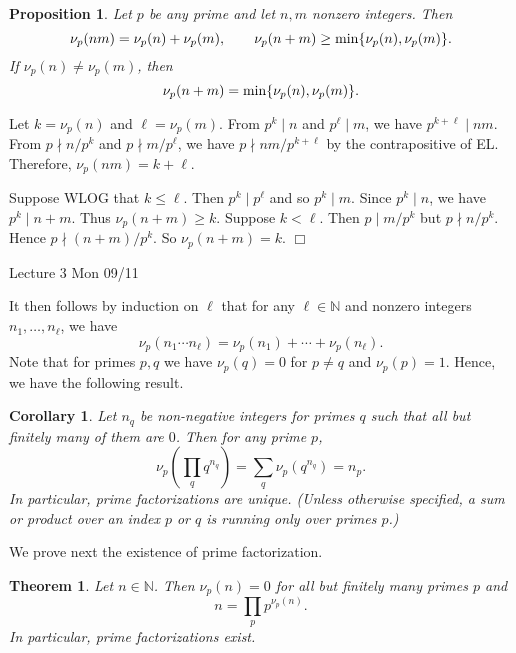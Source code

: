 \documentclass{article}
\def\min{{\rm min}}
\def\N{{\mathbb N}}
\newtheorem{theorem}[subsection]{Theorem}
\newtheorem{cor}[subsection]{Corollary}
\newtheorem{proposition}[subsection]{Proposition}
\newenvironment{proof}{\noindent {\bf Proof:}}{$\Box$ \vspace{2 ex}}
\newcommand{\add}[1]{{\color{blue} #1}}
\begin{document}
\begin{proposition}
    Let $p$ be any prime and let $n,m$ nonzero integers. Then
    $$\nu_p(nm) = \nu_p(n) + \nu_p(m),\qquad \nu_p(n+m) \geq \min\{\nu_p(n),\nu_p(m)\}.$$
    If $\nu_p(n)\neq \nu_p(m)$, then $$\nu_p(n+m) = \min\{\nu_p(n),\nu_p(m)\}.$$
\end{proposition}

\begin{proof}
    Let $k = \nu_p(n)$ and $\ell = \nu_p(m)$. From $p^k\mid n$ and $p^\ell\mid m$, we have $p^{k+\ell}\mid nm$. From $p\nmid n/p^k$ and $p\nmid m/p^\ell$, we have $p\nmid nm/p^{k+\ell}$ by the contrapositive of EL. Therefore, $\nu_p(nm) = k + \ell$.

    Suppose WLOG that $k\leq \ell$. Then $p^k\mid p^\ell$ and so $p^k\mid m$. Since $p^k\mid n$, we have $p^k\mid n+m$. Thus $\nu_p(n+m)\geq k$. Suppose $k<\ell$. Then $p\mid m/p^k$ but $p\nmid n/p^k$. Hence $p\nmid (n+m)/p^k$. So $\nu_p(n+m) = k$.
\end{proof}

\begin{center}
    \add{Lecture 3 Mon 09/11}
\end{center}

It then follows by induction on $\ell$ that for any $\ell\in\N$ and nonzero integers $n_1,\ldots,n_\ell$, we have
$$\nu_p(n_1\cdots n_\ell) = \nu_p(n_1) + \cdots + \nu_p(n_\ell).$$
Note that for primes $p,q$ we have $\nu_p(q) = 0$ for $p\neq q$ and $\nu_p(p) = 1$. Hence, we have the following result.

\begin{cor}
    Let $n_q$ be non-negative integers for primes $q$ such that all but finitely many of them are $0$. Then for any prime $p$,
    $$\nu_p\left(\prod_q q^{n_q}\right) = \sum_q \nu_p(q^{n_q}) =  n_p.$$
    In particular, prime factorizations are unique. (Unless otherwise specified, a sum or product over an index $p$ or $q$ is running only over primes $p$.)
\end{cor}

We prove next the existence of prime factorization.






\begin{theorem}
    Let $n\in\N$. Then $\nu_p(n) = 0$ for all but finitely many primes $p$ and $$n = \prod_{p}p^{\nu_p(n)}.$$
    In particular, prime factorizations exist.
\end{theorem}
\end{document}
